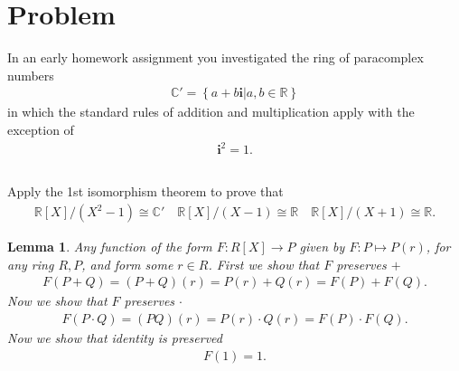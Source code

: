 \documentclass[10pt]{armath}
\newcommand{\R}{\mathbb{R}}
\newcommand{\C}{\mathbb{C}}
\newcommand{\ra}{\rightarrow}
\newtheorem{lemma}{Lemma}
\begin{document}
\section{Problem}%
\label{sec:problem_3}

In an early homework assignment you investigated the ring of paracomplex
numbers
\begin{align*}
  \C'=\left\{a+b\mathbf{i}\vert a,b\in\R\right\}
\end{align*}
in which the standard rules of addition and multiplication apply with the
exception of
\begin{align*}
  \mathbf{i}^2=1.
\end{align*}

\subsection{}%
\label{sub:3a}

Apply the 1st isomorphism theorem to prove that
\begin{align*}
  \R[X]/(X^2-1)\cong\C'\quad\R[X]/(X-1)\cong\R\quad\R[X]/(X+1)\cong\R.
\end{align*}

\begin{lemma}
  Any function of the form $F:R[X]\ra P$ given by $F:P\mapsto P(r)$, for
  any ring $R,P$, and form some $r\in R$.
  First we show that $F$ preserves $+$
  \begin{align*}
    F(P+Q)=(P+Q)(r)=P(r)+Q(r)=F(P)+F(Q).
  \end{align*}
  Now we show that $F$ preserves $\cdot$
  \begin{align*}
    F(P\cdot Q)=(PQ)(r)=P(r)\cdot Q(r)=F(P)\cdot F(Q).
  \end{align*}
  Now we show that identity is preserved
  \begin{align*}
    F(1)=1.
  \end{align*}
\end{lemma}
\end{document}
